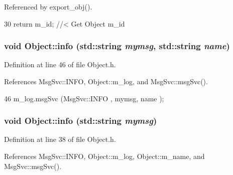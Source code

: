 Referenced by export\_\-obj().


\begin{DoxyCode}
30 { return m_id;         } //< Get Object m_id 
\end{DoxyCode}
\hypertarget{classObject_a1ca123253dfd30fc28b156f521dcbdae}{
\subsubsection[{info}]{\setlength{\rightskip}{0pt plus 5cm}void Object::info (std::string {\em mymsg}, \/  std::string {\em name})}}
\label{classObject_a1ca123253dfd30fc28b156f521dcbdae}


Definition at line 46 of file Object.h.

References MsgSvc::INFO, Object::m\_\-log, and MsgSvc::msgSvc().


\begin{DoxyCode}
46 { m_log.msgSvc (MsgSvc::INFO    , mymsg, name ); }
\end{DoxyCode}
\hypertarget{classObject_a644fd329ea4cb85f54fa6846484b84a8}{
\subsubsection[{info}]{\setlength{\rightskip}{0pt plus 5cm}void Object::info (std::string {\em mymsg})}}
\label{classObject_a644fd329ea4cb85f54fa6846484b84a8}


Definition at line 38 of file Object.h.

References MsgSvc::INFO, Object::m\_\-log, Object::m\_\-name, and MsgSvc::msgSvc().


